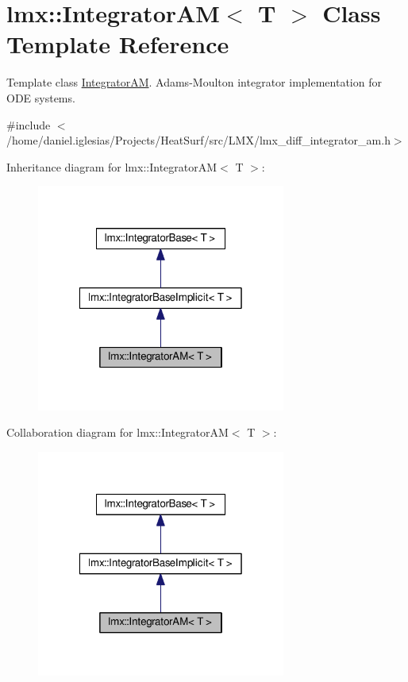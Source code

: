 \hypertarget{classlmx_1_1IntegratorAM}{\section{lmx\-:\-:Integrator\-A\-M$<$ T $>$ Class Template Reference}
\label{classlmx_1_1IntegratorAM}
}


Template class \hyperlink{classlmx_1_1IntegratorAM}{Integrator\-A\-M}. Adams-\/\-Moulton integrator implementation for O\-D\-E systems.  




{\ttfamily \#include $<$/home/daniel.\-iglesias/\-Projects/\-Heat\-Surf/src/\-L\-M\-X/lmx\-\_\-diff\-\_\-integrator\-\_\-am.\-h$>$}



Inheritance diagram for lmx\-:\-:Integrator\-A\-M$<$ T $>$\-:
\nopagebreak
\begin{figure}[H]
\begin{center}
\leavevmode
\includegraphics[width=232pt]{classlmx_1_1IntegratorAM__inherit__graph}
\end{center}
\end{figure}


Collaboration diagram for lmx\-:\-:Integrator\-A\-M$<$ T $>$\-:
\nopagebreak
\begin{figure}[H]
\begin{center}
\leavevmode
\includegraphics[width=232pt]{classlmx_1_1IntegratorAM__coll__graph}
\end{center}
\end{figure}

